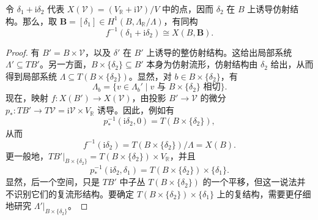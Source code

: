 \begin{proposition}\label{prop:6.31}
令 $\delta_1+\mathrm i\delta_2$ 代表 $X(\mathcal V)=(V_{\mathbb R}+\mathrm i\mathcal V)/V$ 中的点，因而 $\delta_2$ 在 $B$ 上诱导仿射结构。那么，取 $\mathbf B=[\delta_1]\in H^1(B,\Lambda_{\mathbb R}/\Lambda)$，有同构
\[
f^{-1}(\delta_1+\mathrm i\delta_2)\cong X(B,\mathbf B).
\]
\end{proposition}
\begin{proof}
有 $B'=B\times\mathcal V$，以及 $\delta'$ 在 $B'$ 上诱导的整仿射结构。这给出局部系统 $\Lambda'\subseteq TB'$。另一方面，$B\times\{\delta_2\}\subseteq B'$ 本身为仿射流形，仿射结构由 $\delta_2$ 给出，从而得到局部系统 $\Lambda\subseteq T(B\times\{\delta_2\})$。显然，对 $b\in B\times\{\delta_2\}$，有
\[
\Lambda_b=\{v\in\Lambda_b'\mid v\text{ 与 }B\times\{\delta_2\}\text{ 相切}\}.
\]
现在，映射 $f\colon X(B')\to X(\mathcal V)$，由投影 $B'\to\mathcal V$ 的微分 $p_*\colon TB'\to T\mathcal V=\mathrm i\mathcal V\times V_{\mathbb R}$ 诱导。因此，例如有
\[
p_*^{-1}(\mathrm i\delta_2,0)=T(B\times\{\delta_2\}),
\]
从而
\[
f^{-1}(\mathrm i\delta_2)=T(B\times\{\delta_2\})/\Lambda=X(B).
\]
更一般地，$TB'|_{B\times\{\delta_2\}}=T(B\times\{\delta_2\})\times V_{\mathbb R}$，并且
\[
p_*^{-1}(\mathrm i\delta_2,\delta_1)
=T(B\times\{\delta_2\})\times\{\delta_1\}.
\]
显然，后一个空间，只是 $TB'$ 中子丛 $T(B\times\{\delta_2\})$ 的一个平移，但这一说法并不识别它们的复流形结构。要确定 $T(B\times\{\delta_2\})\times\{\delta_1\}$ 上的复结构，需要更仔细地研究 $\Lambda'|_{B\times\{\delta_2\}}$。


\end{proof}
